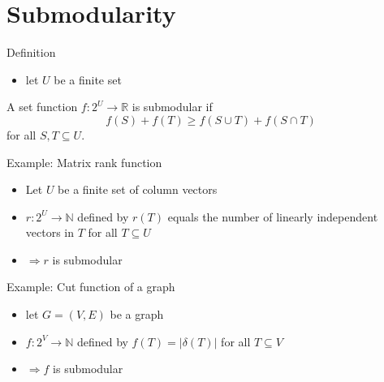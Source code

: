 \documentclass[usenames,dvipsnames]{beamer}
\newcommand{\R}{\mathbb{R}}
\newcommand{\N}{\mathbb{N}}
\begin{document}
\section{Submodularity}

\begin{frame}{Definition}
  \begin{itemize}
  \item  let $U$ be a finite set 
  \end{itemize}
  \begin{definition}
    A set function $f : 2^U \rightarrow \R$ is submodular if \[f(S) +
    f(T) \geq f(S \cup T) + f(S \cap T)\] for all $S,T \subseteq U$.
  \end{definition}
\end{frame}

\begin{frame}{Example: Matrix rank function}
  \begin{itemize}
    \item Let $U$ be a finite set of column vectors 
    \item $r : 2^U \rightarrow \N$ defined by $r(T)$ equals the number
      of linearly independent vectors in $T$ for all $T \subseteq U$
    \item $\Rightarrow r$ is submodular
  \end{itemize}
\end{frame}

\begin{frame}{Example: Cut function of a graph}
  \begin{itemize}
  \item let $G = (V,E)$ be a graph
  \item $f: 2^V \rightarrow \N$ defined by $f(T) = |\delta(T)|$ for
    all $T \subseteq V$ 
  \item $\Rightarrow f$ is submodular
  \end{itemize}
\end{frame}
\end{document}
